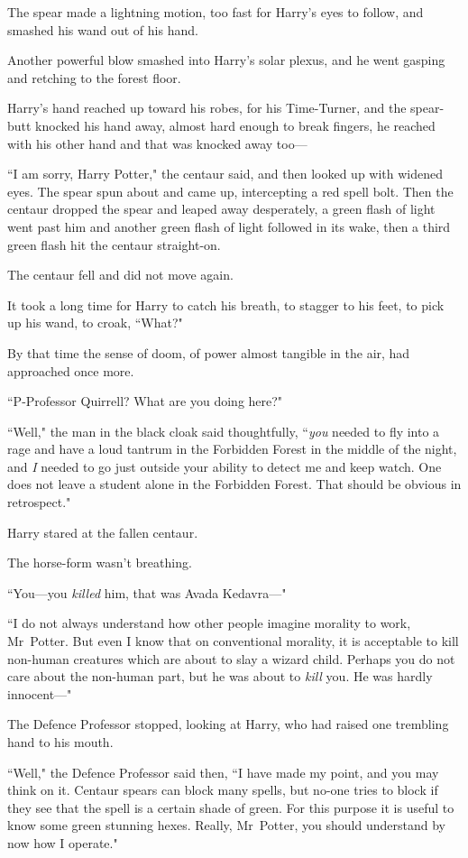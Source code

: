 The spear made a lightning motion, too fast for Harry's eyes to follow, and smashed his wand out of his hand.

Another powerful blow smashed into Harry's solar plexus, and he went gasping and retching to the forest floor.

Harry's hand reached up toward his robes, for his Time-Turner, and the spear-butt knocked his hand away, almost hard enough to break fingers, he reached with his other hand and that was knocked away too—

``I am sorry, Harry Potter," the centaur said, and then looked up with widened eyes. The spear spun about and came up, intercepting a red spell bolt. Then the centaur dropped the spear and leaped away desperately, a green flash of light went past him and another green flash of light followed in its wake, then a third green flash hit the centaur straight-on.

The centaur fell and did not move again.

It took a long time for Harry to catch his breath, to stagger to his feet, to pick up his wand, to croak, ``What?"

By that time the sense of doom, of power almost tangible in the air, had approached once more.

``P-Professor Quirrell? What are you doing here?"

``Well," the man in the black cloak said thoughtfully, ``\emph{you} needed to fly into a rage and have a loud tantrum in the Forbidden Forest in the middle of the night, and \emph{I} needed to go just outside your ability to detect me and keep watch. One does not leave a student alone in the Forbidden Forest. That should be obvious in retrospect."

Harry stared at the fallen centaur.

The horse-form wasn't breathing.

``You—you \emph{killed} him, that was Avada Kedavra—"

``I do not always understand how other people imagine morality to work, Mr~Potter. But even I know that on conventional morality, it is acceptable to kill non-human creatures which are about to slay a wizard child. Perhaps you do not care about the non-human part, but he was about to \emph{kill} you. He was hardly innocent—"

The Defence Professor stopped, looking at Harry, who had raised one trembling hand to his mouth.

``Well," the Defence Professor said then, ``I have made my point, and you may think on it. Centaur spears can block many spells, but no-one tries to block if they see that the spell is a certain shade of green. For this purpose it is useful to know some green stunning hexes. Really, Mr~Potter, you should understand by now how I operate."

